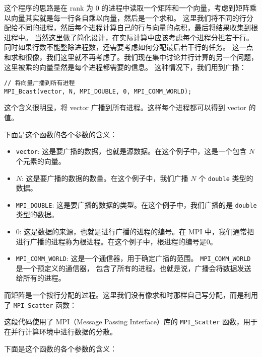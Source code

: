 \documentclass{ctexart}
\begin{document}
这个程序的思路是在 rank 为 0 的进程中读取一个矩阵和一个向量，考虑到矩阵乘以向量其实就是每一行各自乘以向量，然后是一个求和。
这里我们将不同的行分配给不同的进程，然后每个进程计算自己的行与向量的点积，最后将结果收集到根进程中。
当然这里做了简化设计，在实际计算中应该考虑每个进程分担若干行。同时如果行数不能整除进程数，还需要考虑如何分配最后若干行的任务。
这一点和求和很像，我们这里就不再考虑了。我们现在集中讨论并行计算的另一个问题，这里被乘的向量显然是每个进程都需要的信息。
这种情况下，我们用到广播：
\begin{verbatim}
// 将向量广播到所有进程  
MPI_Bcast(vector, N, MPI_DOUBLE, 0, MPI_COMM_WORLD);     
\end{verbatim}
这个含义很明显，将 vector 广播到所有进程。这样每个进程都可以得到 vector 的值。
  
下面是这个函数的各个参数的含义：  
  
\begin{itemize}  
    \item \texttt{vector}: 这是要广播的数据，也就是源数据。在这个例子中，这是一个包含 $N$ 个元素的向量。  
    \item $N$: 这是要广播的数据的数量。在这个例子中，我们广播 $N$ 个 \texttt{double} 类型的数据。  
    \item \texttt{MPI\_DOUBLE}: 这是要广播的数据的类型。在这个例子中，我们广播的是 \texttt{double} 类型的数据。  
    \item $0$: 这是数据的来源，也就是进行广播的进程的编号。在 MPI 中，我们通常把进行广播的进程称为根进程。在这个例子中，根进程的编号是0。  
    \item \texttt{MPI\_COMM\_WORLD}: 这是一个通信器，用于确定广播的范围。 \texttt{MPI\_COMM\_WORLD} 是一个预定义的通信器，
    包含了所有的进程。也就是说，广播会将数据发送给所有的进程。  
\end{itemize}  

而矩阵是一个按行分配的过程。这里我们没有像求和时那样自己写分配，而是利用了 \texttt{MPI\_Scatter} 函数：

这段代码使用了 MPI（Message Passing Interface）库的 \texttt{MPI\_Scatter} 函数，用于在并行计算环境中进行数据的分散。  
  
下面是这个函数的各个参数的含义：  
  
\end{document}
